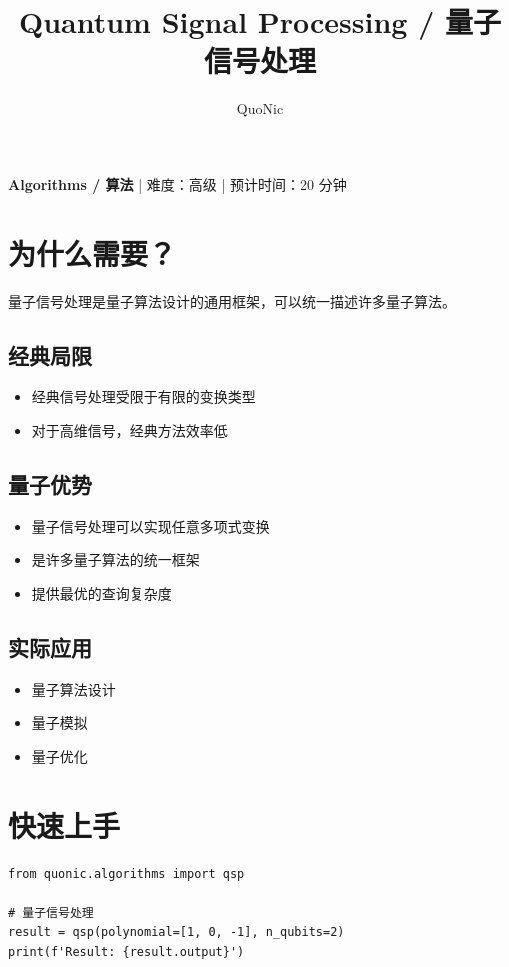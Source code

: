 \documentclass[12pt,a4paper]{article}
\title{Quantum Signal Processing / 量子信号处理}
\author{QuoNic}
\date{}
\begin{document}
\maketitle

\begin{center}
\textbf{Algorithms / 算法} | 难度：高级 | 预计时间：20 分钟
\end{center}

\tableofcontents
\newpage

\section{为什么需要？}

量子信号处理是量子算法设计的通用框架，可以统一描述许多量子算法。

\subsection{经典局限}
\begin{itemize}
  \item 经典信号处理受限于有限的变换类型
  \item 对于高维信号，经典方法效率低
\end{itemize}

\subsection{量子优势}
\begin{itemize}
  \item 量子信号处理可以实现任意多项式变换
  \item 是许多量子算法的统一框架
  \item 提供最优的查询复杂度
\end{itemize}

\subsection{实际应用}
\begin{itemize}
  \item 量子算法设计
  \item 量子模拟
  \item 量子优化
\end{itemize}

\section{快速上手}

\begin{verbatim}
from quonic.algorithms import qsp

# 量子信号处理
result = qsp(polynomial=[1, 0, -1], n_qubits=2)
print(f'Result: {result.output}')
\end{verbatim}
\end{document}
